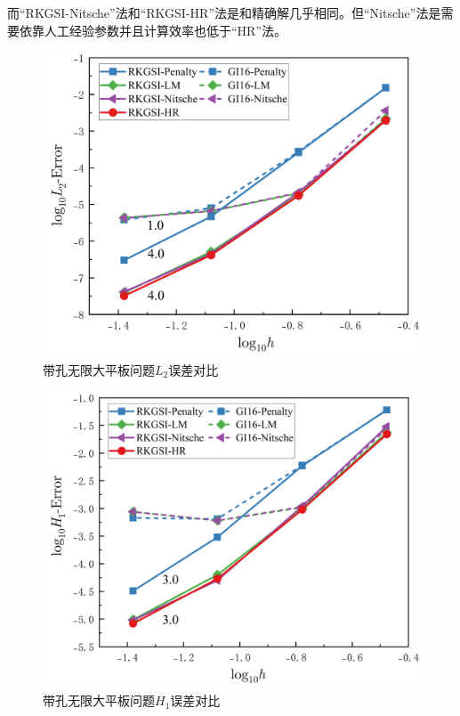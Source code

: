 而“RKGSI-Nitsche”法和“RKGSI-HR”法是和精确解几乎相同。但“Nitsche”法是需要依靠人工经验参数并且计算效率也低于“HR”法。
\newpage
\begin{figure}[H]
    \centering
    \includegraphics[scale=0.5]{figure/EHR/hole/L2.png}
    \caption{带孔无限大平板问题$L_2$误差对比}\label{HL2}
\end{figure}
\begin{figure}[H]
    \centering
    \includegraphics[scale=0.5]{figure/EHR/hole/H1.png}
    \caption{带孔无限大平板问题$H_1$误差对比}\label{HH1}
\end{figure}
\newpage
